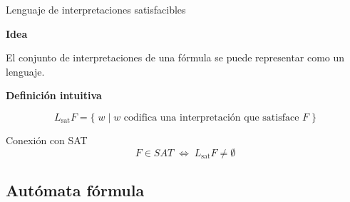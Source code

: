 \documentclass{beamer}
\newcommand{\satlang}{L_{\mathrm{sat}}}
\begin{document}
\begin{frame}{Lenguaje de interpretaciones satisfacibles}

    \pause

    \textbf{Idea}

    El conjunto de interpretaciones de una fórmula se puede representar como un lenguaje.

    \vspace{0.4cm}

    \pause

    \textbf{Definición intuitiva}

    \[
        \satlang{F} =
        \{\; w \mid w \text{ codifica una interpretación que satisface } F \;\}
    \]

    \vspace{0.5cm}

    \pause

    \begin{block}{Conexión con SAT}
        \[
            F \in SAT \;\Longleftrightarrow\; \satlang{F} \neq \emptyset
        \]
    \end{block}

\end{frame}

\subsection{Autómata fórmula}

\begin{frame}
    \tableofcontents
\end{frame}
\end{document}
